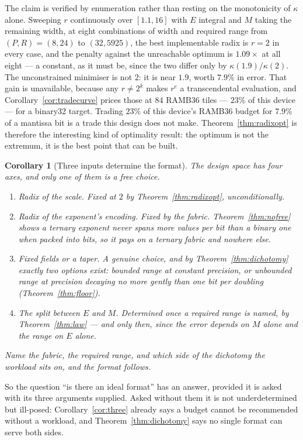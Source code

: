 \documentclass[11pt]{article}
\newtheorem{corollary}{Corollary}
\theoremstyle{definition}
\begin{document}
The claim is verified by enumeration rather than resting on the monotonicity of
$\kappa$ alone. Sweeping $r$ continuously over $[1.1, 16]$ with $E$ integral and
$M$ taking the remaining width, at eight combinations of width and required range
from $(P,R) = (8, 24)$ to $(32, 5925)$, the best implementable radix is $r = 2$ in
every case, and the penalty against the unreachable optimum is $1.09\times$ at all
eight --- a constant, as it must be, since the two differ only by
$\kappa(1.9)/\kappa(2)$. The unconstrained minimiser is not $2$: it is near
$1.9$, worth $7.9\%$ in error. That gain is unavailable, because any
$r \neq 2^{k}$ makes $r^{e}$ a transcendental evaluation, and
Corollary~\ref{cor:tradecurve} prices those at $84$ RAMB36 tiles --- $23\%$ of
this device --- for a binary32 target. Trading $23\%$ of this device's RAMB36 budget for $7.9\%$ of a
mantissa bit is a trade this design does not make. Theorem~\ref{thm:radixopt} is therefore
the interesting kind of optimality result: the optimum is not the extremum, it is
the best point that can be built.

\begin{corollary}[Three inputs determine the format]
\label{cor:determined}
The design space has four axes, and only one of them is a free choice.
\begin{enumerate}
\item \emph{Radix of the scale.} Fixed at $2$ by Theorem~\ref{thm:radixopt},
unconditionally.
\item \emph{Radix of the exponent's encoding.} Fixed by the fabric.
Theorem~\ref{thm:nofree} shows a ternary exponent never spans more values per bit
than a binary one when packed into bits, so it pays on a ternary fabric and
nowhere else.
\item \emph{Fixed fields or a taper.} A genuine choice, and by
Theorem~\ref{thm:dichotomy} exactly two options exist: bounded range at constant
precision, or unbounded range at precision decaying no more gently than one bit
per doubling (Theorem~\ref{thm:floor}).
\item \emph{The split between $E$ and $M$.} Determined once a required range is
named, by Theorem~\ref{thm:law} --- and \emph{only} then, since the error depends
on $M$ alone and the range on $E$ alone.
\end{enumerate}
Name the fabric, the required range, and which side of the dichotomy the workload
sits on, and the format follows.
\end{corollary}

So the question ``is there an ideal format'' has an answer, provided it is asked
with its three arguments supplied. Asked without them it is not underdetermined
but ill-posed: Corollary~\ref{cor:three} already says a budget cannot be
recommended without a workload, and Theorem~\ref{thm:dichotomy} says no single
format can serve both sides.
\end{document}
